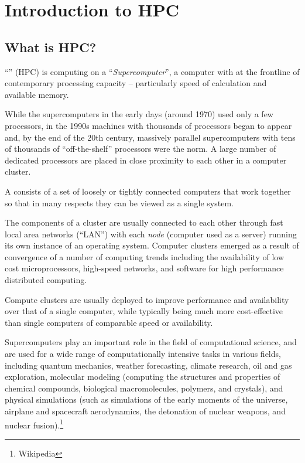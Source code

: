 \chapter{Introduction to HPC}
\label{ch:introduction-to-hpc}

\section{What is HPC?}
\label{sec:what-is-hpc}

``'' (HPC) is computing on a
``\emph{Supercomputer}'', a computer with at the frontline of contemporary
processing capacity -- particularly speed of calculation and available memory.

While the supercomputers in the early days (around 1970) used only a few
processors, in the 1990s machines with thousands of processors began to appear
and, by the end of the 20th century, massively parallel supercomputers with
tens of thousands of ``off-the-shelf'' processors were the norm. A large number
of dedicated processors are placed in close proximity to each other in a
computer cluster.

A  consists of a set of loosely or tightly connected
computers that work together so that in many respects they can be viewed as a
single system.

The components of a cluster are usually connected to each other through fast
local area networks (``LAN'') with each \emph{node} (computer used as a
server) running its own instance of an operating system. Computer clusters
emerged as a result of convergence of a number of computing trends including
the availability of low cost microprocessors, high-speed networks, and software
for high performance distributed computing.

Compute clusters are usually deployed to improve performance and availability
over that of a single computer, while typically being much more cost-effective
than single computers of comparable speed or availability.

Supercomputers play an important role in the field of computational science,
and are used for a wide range of computationally intensive tasks in various
fields, including quantum mechanics, weather forecasting, climate research, oil
and gas exploration, molecular modeling (computing the structures and
properties of chemical compounds, biological macromolecules, polymers, and
crystals), and physical simulations (such as simulations of the early moments
of the universe, airplane and spacecraft aerodynamics, the detonation of
nuclear weapons, and nuclear fusion).\footnote{Wikipedia}

